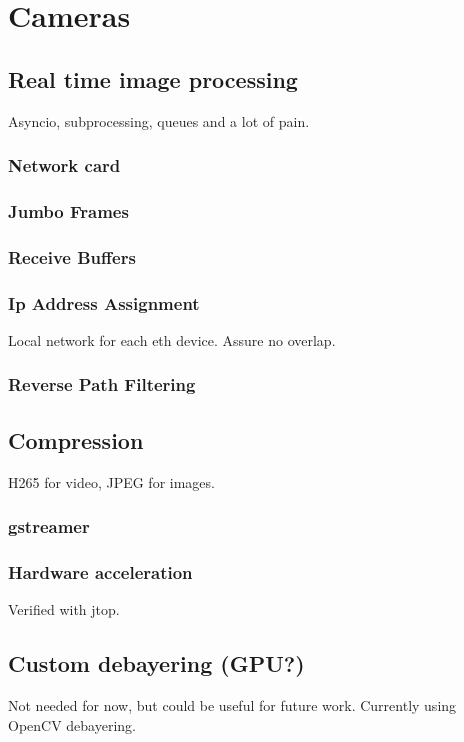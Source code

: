 \chapter{Cameras}



\section{Real time image processing}
Asyncio, subprocessing, queues and a lot of pain.






\subsection*{Network card}
\subsection*{Jumbo Frames}
\subsection*{Receive Buffers}
\subsection*{Ip Address Assignment}
Local network for each eth device.
Assure no overlap.
\subsection*{Reverse Path Filtering}



\section{Compression}
H265 for video, JPEG for images.
\subsection*{gstreamer}
\subsection*{Hardware acceleration}
Verified with \gls{jtop}.

\section{Custom debayering (GPU?)}
Not needed for now, but could be useful for future work.
Currently using OpenCV debayering.

